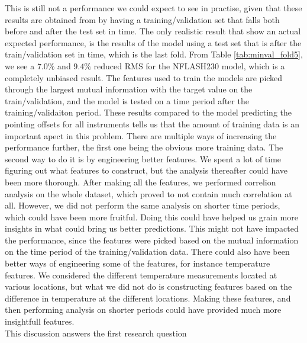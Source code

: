 This is still not a performance we could expect to see in practise,
given that these results are obtained from by having a training/validation set that falls both before and after the test set in time.
The only realistic result that show an actual expected performance, is the results of the model using a test set that is after the train/validation set in time, which is the last fold.
From Table \ref{tab:minval_fold5}, we see a $7.0\%$ and $9.4\%$ reduced RMS for the NFLASH230 model, which is a completely unbiased result.
The features used to train the models are picked through the largest mutual information with the target value on the train/validation, and the model is tested on a time period after the training/validaiton period.
These results compared to the model predicting the pointing offsets for all instruments tells us that the amount of training data is an important apect in this problem.
There are multiple ways of increasing the performance further, the first one being the obvious more training data. 
The second way to do it is by engineering better features.
We spent a lot of time figuring out what features to construct, but the analysis thereafter could have been more thorough.
After making all the features, we performed correlion analysis on the whole dataset, which proved to not contain much correlation at all.
However, we did not perform the same analysis on shorter time periods, which could have been more fruitful.
Doing this could have helped us grain more insights in what could bring us better predictions.
This might not have impacted the performance, since the features were picked based on the mutual information on the time period of the training/validation data.
There could also have been better ways of engineering some of the features, for instance temperature features.
We considered the different temperature measurements located at various locations,
but what we did not do is constructing features based on the difference in temperature at the different locations.
Making these features, and then performing analysis on shorter periods could have provided much more insightfull features.\\
This discussion answers the first research question






